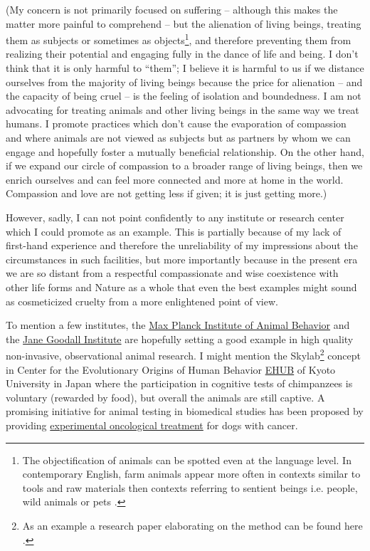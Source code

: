 \documentclass{article}
\begin{document}
(My concern is not primarily focused on suffering -- although this makes the matter more painful to comprehend -- but the alienation of living beings, treating them as subjects or sometimes as objects\footnote{The objectification of animals can be spotted even at the language level. In contemporary English, farm animals appear more often in contexts similar to tools and raw materials then contexts referring to sentient beings i.e. people, wild animals or pets \cite{thesis:Anita}.}, and therefore preventing them from realizing their potential and engaging fully in the dance of life and being. I don't think that it is only harmful to ``them''; I believe it is harmful to us if we distance ourselves from the majority of living beings because the price for alienation -- and the capacity of being cruel -- is the feeling of isolation and boundedness. I am not advocating for treating animals and other living beings in the same way we treat humans. I promote practices which don't cause the evaporation of compassion and where animals are not viewed as subjects but as partners by whom we can engage and hopefully foster a mutually beneficial relationship. On the other hand, if we expand our circle of compassion to a broader range of living beings, then we enrich ourselves and can feel more connected and more at home in the world. Compassion and love are not getting less if given; it is just getting more.)

However, sadly, I can not point confidently to any institute or research center which I could promote as an example. This is partially because of my lack of first-hand experience and therefore the unreliability of my impressions about the circumstances in such facilities, but more importantly because in the present era we are so distant from a respectful compassionate and wise coexistence with other life forms and Nature as a whole that even the best examples might sound as cosmeticized cruelty from a more enlightened point of view.

To mention a few institutes, the \href{https://www.ab.mpg.de/}{Max Planck Institute of Animal Behavior} and the \href{https://janegoodall.org/}{Jane Goodall Institute} are hopefully setting a good example in high quality non-invasive, observational animal research. I might mention the Skylab\footnote{As an example a research paper elaborating on the method can be found here \cite{paper:SkyLabLin2024}.} concept in Center for the Evolutionary Origins of Human Behavior \href{https://www.ehub-kyoto-u.com/en}{EHUB} of Kyoto University in Japan where the participation in cognitive tests of chimpanzees is voluntary (rewarded by food), but overall the animals are still captive. A promising initiative for animal testing in biomedical studies has been proposed by providing \href{https://www.nytimes.com/2006/11/24/business/in-trials-for-new-cancer-drugs-family-pets-are-benefiting-too.html}{experimental oncological treatment} for dogs with cancer.
\end{document}
